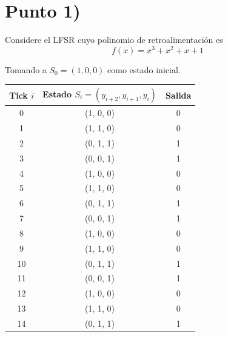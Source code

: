 \documentclass{article}
\begin{document}
  
  \section*{Punto 1)}
    Considere el LFSR cuyo polinomio de retroalimentación es 
      \[f(x) = x^3 + x^2 + x + 1\]

    Tomando a $S_0 = (1, 0, 0)$ como estado inicial.

    \begin{table}[h]
    \centering
      \begin{tabular}{|c|c|c|}
        \hline
        \textbf{Tick $i$} & \textbf{Estado $S_i = (y_{i+2}, y_{i+1}, y_i)$} & \textbf{Salida} \\ \hline
        0        & (1, 0, 0)                              & 0               \\ \hline
        1        & (1, 1, 0)                              & 0               \\ \hline
        2        & (0, 1, 1)                              & 1               \\ \hline
        3        & (0, 0, 1)                              & 1               \\ \hline
        4        & (1, 0, 0)                              & 0               \\ \hline
        5        & (1, 1, 0)                              & 0               \\ \hline
        6        & (0, 1, 1)                              & 1               \\ \hline
        7        & (0, 0, 1)                              & 1               \\ \hline
        8        & (1, 0, 0)                              & 0               \\ \hline
        9        & (1, 1, 0)                              & 0               \\ \hline
        10       & (0, 1, 1)                              & 1               \\ \hline
        11       & (0, 0, 1)                              & 1               \\ \hline
        12       & (1, 0, 0)                              & 0               \\ \hline
        13       & (1, 1, 0)                              & 0               \\ \hline
        14       & (0, 1, 1)                              & 1               \\ \hline
      \end{tabular}
    \end{table}
\end{document}
